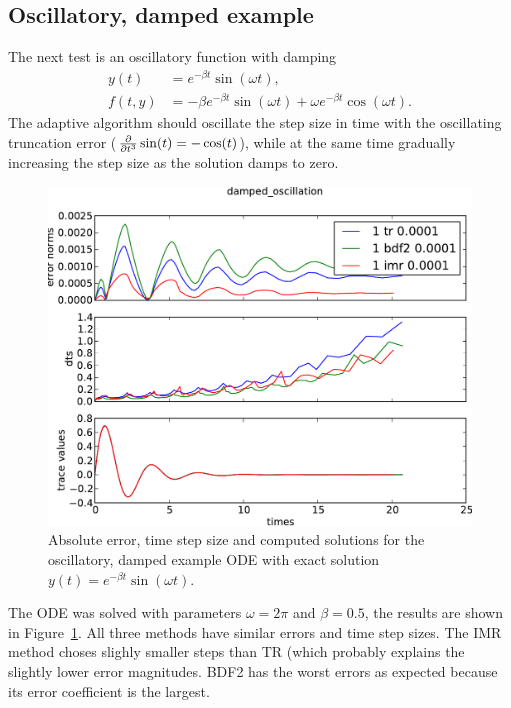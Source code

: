 \subsection{Oscillatory, damped example}
\label{sec:oscill-damp-example}

The next test is an oscillatory function with damping
\begin{equation}
  \label{eqn:imr-test-osc-damp}
  \begin{aligned}
    y(t) &= e^{-\beta t} \sin(\omega t), \\
    f(t,y) &= - \beta e^{-\beta t} \sin(\omega t) + \omega e^{-\beta t} \cos(\omega t).  \end{aligned}
\end{equation} 
The adaptive algorithm should oscillate the step size in time with the oscillating truncation error ($\frac{\partial }{\partial t^3} \sin(t) = -\cos(t)$), while at the same time gradually increasing the step size as the solution damps to zero.

\begin{figure}[h!]
  \centering \includegraphics[width=1\textwidth]{aimr/damped_oscillation-errornormsvs-dtsvs-tracevaluesvstimes}
  \caption{Absolute error, time step size and computed solutions for the oscillatory, damped example ODE with exact solution $y(t) = e^{-\beta t} \sin(\omega t)$.}
  \label{fig:imr-osc-example}
\end{figure}

The ODE was solved with parameters $\omega = 2 \pi$ and $\beta = 0.5$, the results are shown in Figure~\ref{fig:imr-osc-example}.
All three methods have similar errors and time step sizes.
The IMR method choses slighly smaller steps than TR (which probably explains the slightly lower error magnitudes.
BDF2 has the worst errors as expected because its error coefficient is the largest.

